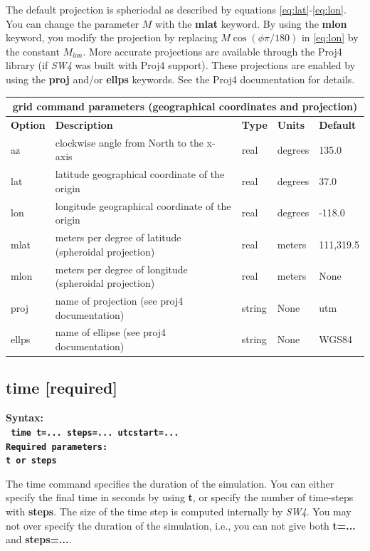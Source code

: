 \documentclass[11pt]{report}
\begin{document}
The default projection is spheriodal as described by equations \eqref{eq:lat}-\eqref{eq:lon}. You
can change the parameter $M$ with the {\bf mlat} keyword. By using the {\bf mlon} keyword, you
modify the projection by replacing $M\cos(\phi\pi/180)$ in \eqref{eq:lon} by the constant
$M_{lon}$. More accurate projections are available through the Proj4 library (if \emph{SW4} was
built with Proj4 support). These projections are enabled by using the {\bf proj} and/or {\bf ellps}
keywords. See the Proj4 documentation for details.
\begin{center}
\begin{tabular}{|l|p{8cm}|l|l|l|} \hline
\multicolumn{5}{|c|}{\bf grid command parameters (geographical coordinates and projection)}\\ \hline
\bf{Option} & \bf{Description} & \bf{Type} & \bf{Units} & \bf{Default}\\ \hline \hline
az & clockwise angle from North to the x-axis & real & degrees & 135.0 \\ \hline
lat & latitude geographical coordinate of the origin & real & degrees & 37.0 \\ \hline
lon & longitude geographical coordinate of the origin & real & degrees & -118.0 \\ \hline
mlat & meters per degree of latitude (spheroidal projection) & real & meters & 111,319.5 \\ \hline
mlon & meters per degree of longitude (spheroidal projection) & real & meters & None \\ \hline
proj & name of  projection (see proj4 documentation) & string & None & utm \\ \hline
ellps & name of ellipse (see proj4 documentation) & string & None & WGS84 \\ \hline
\end{tabular}
\end{center}

\subsection{time [required]}
\begin{flushleft}
\bf Syntax:\\
\tt
time t=... steps=... utcstart=...\\
\bf Required parameters:\\
\tt t \rm or \tt steps
\end{flushleft}
The time command specifies the duration of the simulation. You can either specify the final time in
seconds by using {\bf t}, or specify the number of time-steps with {\bf steps}.  The size of the
time step is computed internally by \emph{SW4}. You may not over specify the duration of the
simulation, i.e., you can not give both {\bf t=...} and {\bf steps=...}.
\end{document}
